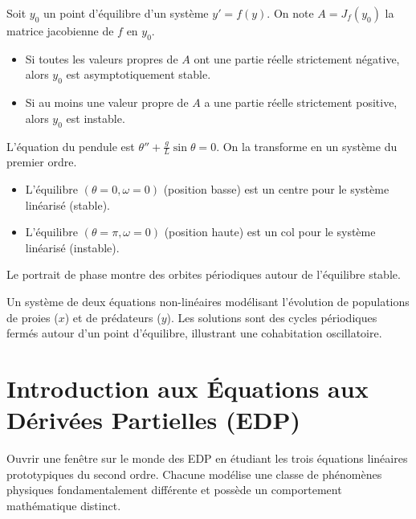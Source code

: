 \begin{theorem}
    Soit $y_0$ un point d'équilibre d'un système $y'=f(y)$. On note $A = J_f(y_0)$ la matrice jacobienne de $f$ en $y_0$.
    \begin{itemize}
        \item Si toutes les valeurs propres de $A$ ont une partie réelle strictement négative, alors $y_0$ est asymptotiquement stable.
        \item Si au moins une valeur propre de $A$ a une partie réelle strictement positive, alors $y_0$ est instable.
    \end{itemize}
\end{theorem}

\begin{example}
    L'équation du pendule est $\theta'' + \frac{g}{L}\sin\theta = 0$. On la transforme en un système du premier ordre.
    \begin{itemize}
        \item L'équilibre $(\theta=0, \omega=0)$ (position basse) est un centre pour le système linéarisé (stable).
        \item L'équilibre $(\theta=\pi, \omega=0)$ (position haute) est un col pour le système linéarisé (instable).
    \end{itemize}
    Le portrait de phase montre des orbites périodiques autour de l'équilibre stable. 
\end{example}

\begin{example}
    Un système de deux équations non-linéaires modélisant l'évolution de populations de proies ($x$) et de prédateurs ($y$). Les solutions sont des cycles périodiques fermés autour d'un point d'équilibre, illustrant une cohabitation oscillatoire.
\end{example}

\section{Introduction aux Équations aux Dérivées Partielles (EDP)}

\begin{objectif}
    Ouvrir une fenêtre sur le monde des EDP en étudiant les trois équations linéaires prototypiques du second ordre. Chacune modélise une classe de phénomènes physiques fondamentalement différente et possède un comportement mathématique distinct.
\end{objectif}

